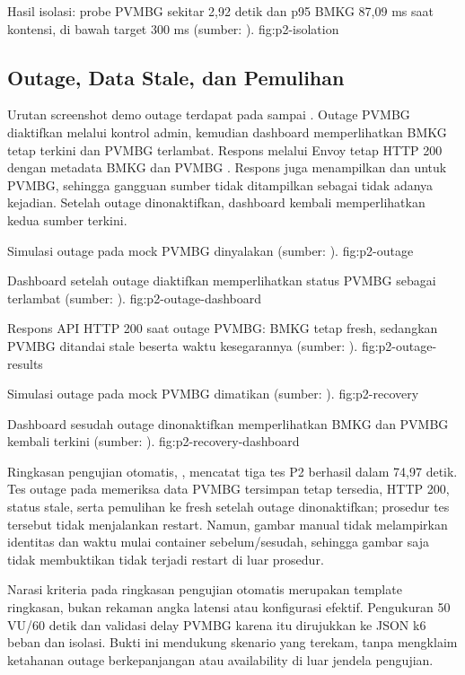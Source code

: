 {Hasil isolasi: probe PVMBG sekitar 2,92 detik dan p95 BMKG 87,09 ms saat kontensi, di bawah target 300 ms (sumber: ).}
{fig:p2-isolation}

\subsection{Outage, Data Stale, dan Pemulihan}

Urutan screenshot demo outage terdapat pada  sampai
. Outage PVMBG diaktifkan melalui kontrol admin,
kemudian dashboard memperlihatkan BMKG tetap terkini dan PVMBG terlambat.
Respons  melalui Envoy tetap HTTP 200 dengan
metadata BMKG  dan PVMBG . Respons juga menampilkan
 dan  untuk PVMBG, sehingga gangguan
sumber tidak ditampilkan sebagai tidak adanya kejadian. Setelah outage
dinonaktifkan, dashboard kembali memperlihatkan kedua sumber terkini.

{Simulasi outage pada mock PVMBG dinyalakan (sumber: ).}
{fig:p2-outage}

{Dashboard setelah outage diaktifkan memperlihatkan status PVMBG sebagai terlambat (sumber: ).}
{fig:p2-outage-dashboard}

{Respons API HTTP 200 saat outage PVMBG: BMKG tetap fresh, sedangkan PVMBG ditandai stale beserta waktu kesegarannya (sumber: ).}
{fig:p2-outage-results}

{Simulasi outage pada mock PVMBG dimatikan (sumber: ).}
{fig:p2-recovery}

{Dashboard sesudah outage dinonaktifkan memperlihatkan BMKG dan PVMBG kembali terkini (sumber: ).}
{fig:p2-recovery-dashboard}

Ringkasan pengujian otomatis, , mencatat tiga
tes P2 berhasil dalam 74,97 detik. Tes outage pada
 memeriksa data PVMBG tersimpan tetap tersedia,
HTTP 200, status stale, serta pemulihan ke fresh setelah outage dinonaktifkan;
prosedur tes tersebut tidak menjalankan restart. Namun, gambar manual tidak
melampirkan identitas dan waktu mulai container sebelum/sesudah, sehingga
gambar saja tidak membuktikan tidak terjadi restart di luar prosedur.

Narasi kriteria pada ringkasan pengujian otomatis merupakan template ringkasan, bukan rekaman angka
latensi atau konfigurasi efektif. Pengukuran 50 VU/60 detik dan validasi delay
PVMBG karena itu dirujukkan ke JSON k6 beban dan isolasi. Bukti ini mendukung skenario yang
terekam, tanpa mengklaim ketahanan outage berkepanjangan atau availability
di luar jendela pengujian.
